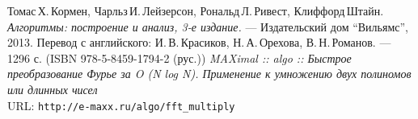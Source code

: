  
\begin{thebibliography}{99}
	Томас\,Х.\,Кормен, Чарльз\,И.\,Лейзерсон, Рональд\,Л.\,Ривест, Клиффорд\,Штайн.
	{\itshape Алгоритмы: построение и анализ, 3-е издание.} --- Издательский дом \enquote{Вильямс}, 2013. Перевод с английского: И.\,В.\,Красиков, Н.\,А.\,Орехова, В.\,Н.\,Романов. --- 1296 с. (ISBN 978-5-8459-1794-2 (рус.))
	{\itshape MAXimal :: algo :: Быстрое преобразование Фурье за O (N log N). Применение к умножению двух полиномов или длинных чисел } \\URL: \texttt{http://e-maxx.ru/algo/fft\_multiply}
\end{thebibliography}
\pagebreak